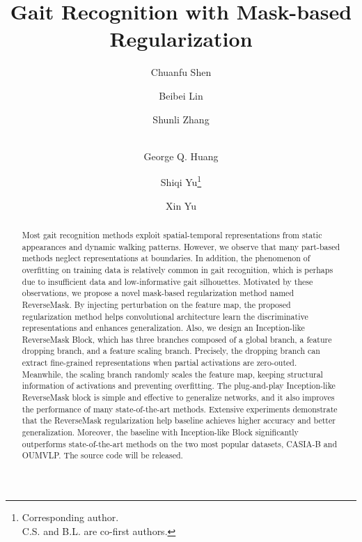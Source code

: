 \documentclass[runningheads]{llncs}
\begin{document}
\pagestyle{headings}
\mainmatter
\def\ECCVSubNumber{1956}  

\title{Gait Recognition with Mask-based Regularization} 

\begin{comment}
\titlerunning{ECCV-22 submission ID \ECCVSubNumber} 
\authorrunning{ECCV-22 submission ID \ECCVSubNumber} 
\author{Anonymous ECCV submission}
\institute{Paper ID \ECCVSubNumber}
\end{comment}


\author{Chuanfu Shen\textsuperscript{} \and
Beibei Lin\textsuperscript{} \and
Shunli Zhang \and\\
George Q. Huang \and 
Shiqi Yu\thanks{Corresponding author.\\  C.S. and B.L. are co-first authors.} \and
Xin Yu 
}
\maketitle


\begin{abstract}

      Most gait recognition methods exploit spatial-temporal representations from static appearances and dynamic walking patterns. 
      However, we observe that many part-based methods neglect representations at boundaries. In addition, the phenomenon of overfitting on training data is relatively common in gait recognition, which is perhaps due to insufficient data and low-informative gait silhouettes.
      Motivated by these observations, we propose a novel mask-based regularization method named ReverseMask. By injecting perturbation on the feature map, the proposed regularization method helps convolutional architecture learn the discriminative representations and enhances generalization. Also, we design an Inception-like ReverseMask Block, which has three branches composed of a global branch, a feature dropping branch, and a feature scaling branch. Precisely, the dropping branch can extract fine-grained representations when partial activations are zero-outed. Meanwhile, the scaling branch randomly scales the feature map, keeping structural information of activations and preventing overfitting. The plug-and-play Inception-like ReverseMask block is simple and effective to generalize networks, and it also improves the performance of many state-of-the-art methods. Extensive experiments demonstrate that the ReverseMask regularization help baseline achieves higher accuracy and better generalization. Moreover, the baseline with Inception-like Block significantly outperforms state-of-the-art methods on the two most popular datasets, CASIA-B and OUMVLP. The source code will be released.
      
\end{abstract}
\end{document}
